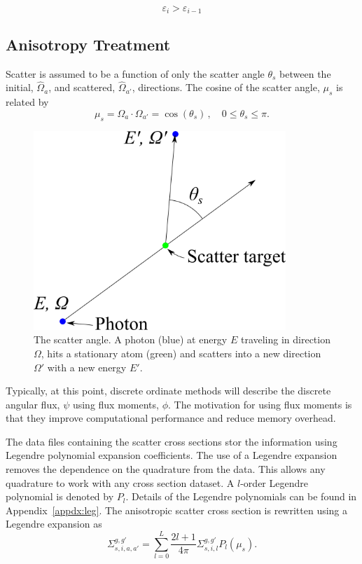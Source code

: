 \begin{equation}\label{eq:conv4}
\varepsilon_i > \varepsilon_{i-1}
\end{equation}

\subsection{Anisotropy Treatment}\label{sec:aniso}

Scatter is assumed to be a function of only the scatter angle $\theta_s$ between the initial, $\hat{\Omega}_a$, and scattered, $\hat{\Omega}_{a'}$, directions. The cosine of the scatter angle, $\mu_s$ is related by 
\begin{equation} \label{eq:scat_cos}
\mu_s = \Omega_a \cdot \Omega_{a'} = \cos(\theta_s) \,, \quad 0 \leq \theta_s \leq \pi.
\end{equation}

\begin{figure}[tb]
  \begin{center}
   \includegraphics[width=3.75in]{figs/scat_ang}
  \end{center}
  \caption{The scatter angle. A photon (blue) at energy $E$ traveling in direction $\Omega$, hits a stationary atom (green) and scatters into a new direction $\Omega'$ with a new energy $E'$.}
\label{fig:scat_ang}
\end{figure}%

Typically, at this point, discrete ordinate methods will describe the discrete angular flux, $\psi$ using flux moments, $\phi$. The motivation for using flux moments is that they improve computational performance and reduce memory overhead.

The data files containing the scatter cross sections stor the information using Legendre polynomial expansion coefficients. The use of a Legendre expansion removes the dependence on the quadrature from the data. This allows any quadrature to work with any cross section dataset. A $l$-order Legendre polynomial is denoted by $P_l$. Details of the Legendre polynomials can be found in Appendix~\ref{appdx:leg}. The anisotropic scatter cross section is rewritten using a Legendre expansion as
\begin{equation} \label{eq:leg_1}
\Sigma_{s, i, a, a'}^{g, g'} = \sum_{l=0}^L \frac{2l+1}{4 \pi}\Sigma_{s, i, l}^{g, g'} P_l(\mu_s).
\end{equation}

